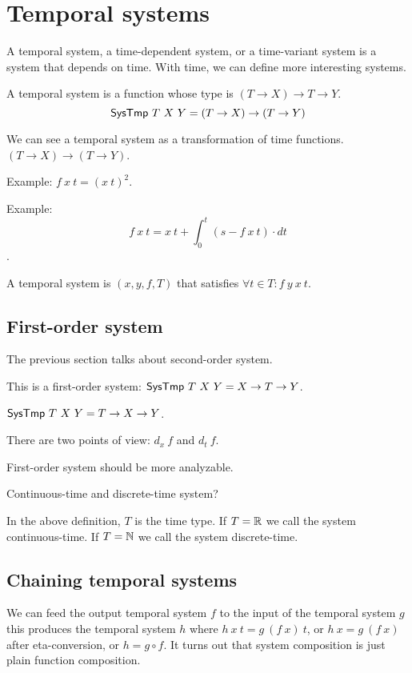 \chapter{Temporal systems}

A temporal system, a time-dependent system, or a time-variant system is a system that depends on time.
With time, we can define more interesting systems.

\begin{m:def}
    A temporal system is a function whose type is \((T \to X) \to T \to Y\).
\[
    \textsf{SysTmp}~T~X~Y = (T \to X) \to (T \to Y)
\]
\end{m:def}

We can see a temporal system as a transformation of time functions.
\((T \to X) \to (T \to Y)\).

Example:
\(f~x~t = (x~t)^2\).

Example:
\[f~x~t = x~t + \int_0^t (s - f~x~t) \cdot dt\].

\begin{m:def}
    A temporal system is \((x,y,f,T)\) that satisfies
    \(\forall t \in T : f~y~x~t\).
\end{m:def}

\section{First-order system}

The previous section talks about second-order system.

This is a first-order system:
\(\textsf{SysTmp}~T~X~Y = X \to T \to Y \).

\(\textsf{SysTmp}~T~X~Y = T \to X \to Y \).

There are two points of view: \(d_x~f\) and \(d_t~f\).

First-order system should be more analyzable.

Continuous-time and discrete-time system?

In the above definition, \(T\) is the time type.
If \(T = \mathbb{R}\) we call the system continuous-time.
If \(T = \mathbb{N}\) we call the system discrete-time.

\section{Chaining temporal systems}

We can feed the output temporal system \(f\)
to the input of the temporal system \(g\)
this produces the temporal system \(h\) where
\(h~x~t = g~(f~x)~t\),
or \(h~x = g~(f~x)\) after eta-conversion,
or \(h = g \circ f\).
It turns out that system composition is just plain function composition.

